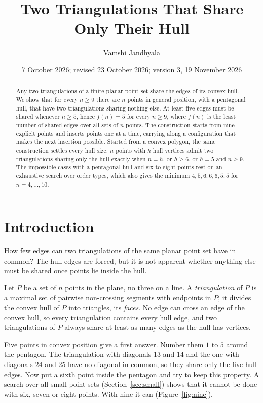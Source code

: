 \documentclass[11pt]{amsart}
\title{Two Triangulations That Share Only Their Hull}
\author{Vamshi Jandhyala}
\date{7 October 2026; revised 23 October 2026; version 3, 19 November 2026}
\theoremstyle{definition}
\begin{document}
\begin{abstract}
Any two triangulations of a finite planar point set share the edges of its convex hull. We show that for every $n\geq9$ there are $n$ points in general position, with a pentagonal hull, that have two triangulations sharing nothing else. At least five edges must be shared whenever $n\geq5$, hence $f(n)=5$ for every $n\geq9$, where $f(n)$ is the least number of shared edges over all sets of $n$ points. The construction starts from nine explicit points and inserts points one at a time, carrying along a configuration that makes the next insertion possible. Started from a convex polygon, the same construction settles every hull size: $n$ points with $h$ hull vertices admit two triangulations sharing only the hull exactly when $n=h$, or $h\geq6$, or $h=5$ and $n\geq9$. The impossible cases with a pentagonal hull and six to eight points rest on an exhaustive search over order types, which also gives the minimum $4,5,6,6,6,5,5$ for $n=4,\dots,10$.
\end{abstract}

\maketitle

\section{Introduction}

How few edges can two triangulations of the same planar point set have in common? The hull edges are forced, but it is not apparent whether anything else must be shared once points lie inside the hull.

Let $P$ be a set of $n$ points in the plane, no three on a line. A \emph{triangulation} of $P$ is a maximal set of pairwise non-crossing segments with endpoints in $P$; it divides the convex hull of $P$ into triangles, its \emph{faces}. No edge can cross an edge of the convex hull, so every triangulation contains every hull edge, and two triangulations of $P$ always share at least as many edges as the hull has vertices.

Five points in convex position give a first answer. Number them $1$ to $5$ around the pentagon. The triangulation with diagonals $13$ and $14$ and the one with diagonals $24$ and $25$ have no diagonal in common, so they share only the five hull edges. Now put a sixth point inside the pentagon and try to keep this property. A search over all small point sets (Section~\ref{sec:small}) shows that it cannot be done with six, seven or eight points. With nine it can (Figure~\ref{fig:nine}).
\end{document}
